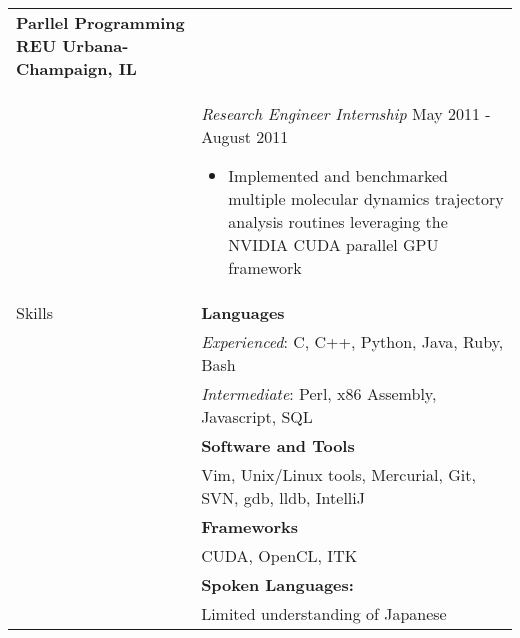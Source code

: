 \documentclass[11pt]{article}
\begin{document}
\begin{tabular}{p{0.75in} p{5.45in}}
        \textbf{Parllel Programming REU \hfill Urbana-Champaign, IL} \vspace{0.015in} \\ &
        {\textit{Research Engineer Internship} \hfill May 2011 - August 2011} \vspace{0.02in}
        \begin{itemize}
            \renewcommand{\labelitemi}{$\diamond$}
            \item Implemented and benchmarked multiple molecular dynamics trajectory analysis routines leveraging the NVIDIA CUDA parallel GPU framework 
        \end{itemize} \\

        

    {Skills} &
        \textbf{Languages} \\ &
        \qquad \textit{Experienced}: C, C++, Python, Java, Ruby, Bash \\ &
        \qquad \textit{Intermediate}: Perl, x86 Assembly, Javascript, SQL \\ & \vspace{0.015in}
        \textbf{Software and Tools} \\ &
        \qquad Vim, Unix/Linux tools, Mercurial, Git, SVN, gdb, lldb, IntelliJ \\ & \vspace{0.015in}
        \textbf{Frameworks} \\ &
        \qquad CUDA, OpenCL, ITK \\ & \vspace{0.015in}
        \textbf{Spoken Languages:} \\ &
        \qquad Limited understanding of Japanese \\
\end{tabular}
\end{document}
